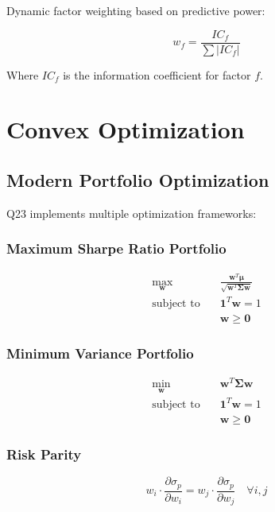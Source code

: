 \documentclass[11pt,letterpaper]{book}
\begin{document}
Dynamic factor weighting based on predictive power:

\begin{equation}
w_f = \frac{IC_f}{\sum |IC_f|}
\end{equation}

Where $IC_f$ is the information coefficient for factor $f$.

\section{Convex Optimization}

\subsection{Modern Portfolio Optimization}

Q23 implements multiple optimization frameworks:

\subsubsection{Maximum Sharpe Ratio Portfolio}

\begin{align}
\max_{\mathbf{w}} \quad & \frac{\mathbf{w}^T \boldsymbol{\mu}}{\sqrt{\mathbf{w}^T \boldsymbol{\Sigma} \mathbf{w}}} \\
\text{subject to} \quad & \mathbf{1}^T \mathbf{w} = 1 \\
& \mathbf{w} \geq \mathbf{0}
\end{align}

\subsubsection{Minimum Variance Portfolio}

\begin{align}
\min_{\mathbf{w}} \quad & \mathbf{w}^T \boldsymbol{\Sigma} \mathbf{w} \\
\text{subject to} \quad & \mathbf{1}^T \mathbf{w} = 1 \\
& \mathbf{w} \geq \mathbf{0}
\end{align}

\subsubsection{Risk Parity}

\begin{equation}
w_i \cdot \frac{\partial \sigma_p}{\partial w_i} = w_j \cdot \frac{\partial \sigma_p}{\partial w_j} \quad \forall i,j
\end{equation}
\end{document}

